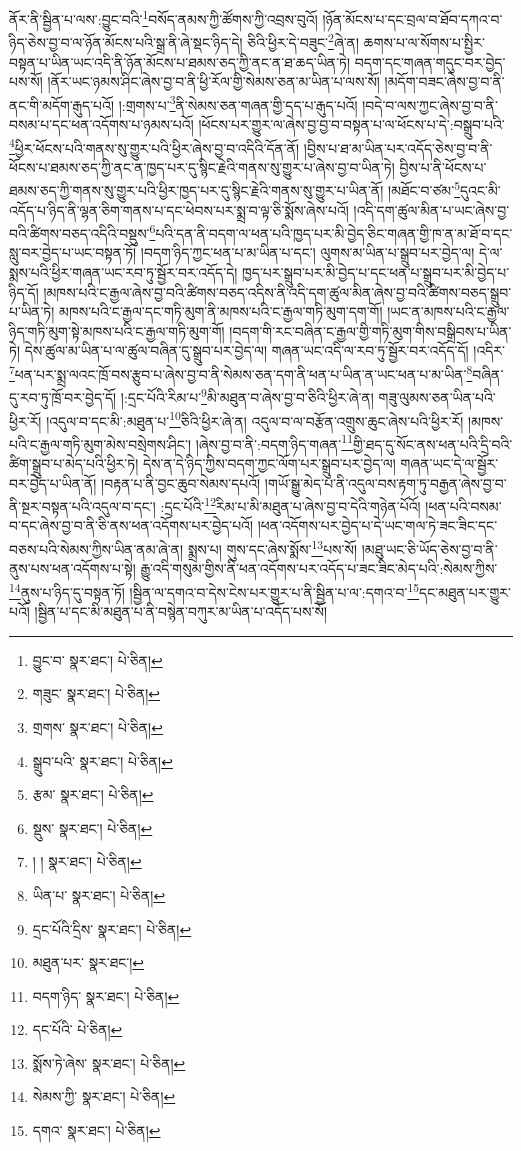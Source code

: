 ནོར་ནི་སྦྱིན་པ་ལས་:བྱུང་བའི་\footnote{བྱུང་བ་  སྣར་ཐང་།  པེ་ཅིན། }བསོད་ནམས་ཀྱི་ཚོགས་ཀྱི་འབྲས་བུའོ། །ཉོན་མོངས་པ་དང་བྲལ་བ་ཐོབ་དཀའ་བ་ཉིད་ཅེས་བྱ་བ་ལ་ཉོན་མོངས་པའི་སྒྲ་ནི་ཞེ་སྡང་ཉིད་དེ། ཅིའི་ཕྱིར་དེ་བཟུང་\footnote{གཟུང་  སྣར་ཐང་།  པེ་ཅིན། }ཞེ་ན། ཆགས་པ་ལ་སོགས་པ་སྤྱིར་བསྟན་པ་ཡིན་ཡང་འདི་ནི་ཉོན་མོངས་པ་ཐམས་ཅད་ཀྱི་ནང་ན་ཐ་ཆད་ཡིན་ཏེ། བདག་དང་གཞན་གདུང་བར་བྱེད་པས་སོ། །ནོར་ཡང་ཉམས་ཤིང་ཞེས་བྱ་བ་ནི་ཕྱི་རོལ་གྱི་སེམས་ཅན་མ་ཡིན་པ་ལས་སོ། །མདོག་བཟང་ཞེས་བྱ་བ་ནི་ནང་གི་མདོག་རྒུད་པའོ། །:གྲགས་པ་\footnote{གྲགས་  སྣར་ཐང་།  པེ་ཅིན། }ནི་སེམས་ཅན་གཞན་གྱི་དད་པ་རྒུད་པའོ། །བདེ་བ་ལས་ཀྱང་ཞེས་བྱ་བ་ནི་བསམ་པ་དང་ཕན་འདོགས་པ་ཉམས་པའོ། །ཕོངས་པར་གྱུར་ལ་ཞེས་བྱ་བྱ་བ་བསྟན་པ་ལ་ཕོངས་པ་དེ་:བསྒྲུབ་པའི་\footnote{སྒྲུབ་པའི་  སྣར་ཐང་།  པེ་ཅིན། }ཕྱིར་ཕོངས་པའི་གནས་སུ་གྱུར་པའི་ཕྱིར་ཞེས་བྱ་བ་འདིའི་དོན་ནོ། །བྱིས་པ་ཐ་མ་ཡིན་པར་འདོད་ཅེས་བྱ་བ་ནི་ཕོངས་པ་ཐམས་ཅད་ཀྱི་ནང་ན་ཁྱད་པར་དུ་སྙིང་རྗེའི་གནས་སུ་གྱུར་པ་ཞེས་བྱ་བ་ཡིན་ཏེ། བྱིས་པ་ནི་ཕོངས་པ་ཐམས་ཅད་ཀྱི་གནས་སུ་གྱུར་པའི་ཕྱིར་ཁྱད་པར་དུ་སྙིང་རྗེའི་གནས་སུ་གྱུར་པ་ཡིན་ནོ། །མཐོང་བ་ཙམ་\footnote{རྩམ་  སྣར་ཐང་།  པེ་ཅིན། }དུའང་མི་འདོད་པ་ཉིད་ནི་ལྷན་ཅིག་གནས་པ་དང་ཕེབས་པར་སྨྲ་བ་ལྟ་ཅི་སྨོས་ཞེས་པའོ། །འདི་དག་ཚུལ་མིན་པ་ཡང་ཞེས་བྱ་བའི་ཚིགས་བཅད་འདིའི་བསྡུས་\footnote{སྡུས་  སྣར་ཐང་།  པེ་ཅིན། }པའི་དན་ནི་བདག་ལ་ཕན་པའི་ཁྱད་པར་མི་བྱེད་ཅིང་གཞན་གྱི་ཁ་ན་མ་ཐོ་བ་དང་སླུ་བར་བྱེད་པ་ཡང་བསྟན་ཏོ། །བདག་ཉིད་ཀྱང་ཕན་པ་མ་ཡིན་པ་དང་། ལུགས་མ་ཡིན་པ་སྒྲུབ་པར་བྱེད་ལ། དེ་ལ་སྨས་པའི་ཕྱིར་གཞན་ཡང་རབ་ཏུ་སྦྱོར་བར་འདོད་དེ། ཁྱད་པར་སྒྲུབ་པར་མི་བྱེད་པ་དང་ཕན་པ་སྒྲུབ་པར་མི་བྱེད་པ་ཉིད་དོ། །མཁས་པའི་ང་རྒྱལ་ཞེས་བྱ་བའི་ཚིགས་བཅད་འདིས་ནི་འདི་དག་ཚུལ་མིན་ཞེས་བྱ་བའི་ཚིགས་བཅད་སྒྲུབ་པ་ཡིན་ཏེ། མཁས་པའི་ང་རྒྱལ་དང་གཏི་མུག་ནི་མཁས་པའི་ང་རྒྱལ་གཏི་མུག་དག་གོ། །ཡང་ན་མཁས་པའི་ང་རྒྱལ་ཉིད་གཏི་མུག་སྟེ་མཁས་པའི་ང་རྒྱལ་གཏི་མུག་གོ། །བདག་གི་རང་བཞིན་ང་རྒྱལ་གྱི་གཏི་མུག་གིས་བསྒྲིབས་པ་ཡིན་ཏེ། དེས་ཚུལ་མ་ཡིན་པ་ལ་ཚུལ་བཞིན་དུ་སྒྲུབ་པར་བྱེད་ལ། གཞན་ཡང་འདི་ལ་རབ་ཏུ་སྦྱོར་བར་འདོད་དོ། །འདིར་\footnote{། །  སྣར་ཐང་།  པེ་ཅིན། }ཕན་པར་སྨྲ་ལའང་ཁྲོ་བས་རྩུབ་པ་ཞེས་བྱ་བ་ནི་སེམས་ཅན་དག་ནི་ཕན་པ་ཡིན་ན་ཡང་ཕན་པ་མ་ཡིན་\footnote{ཡིན་པ་  སྣར་ཐང་།  པེ་ཅིན། }བཞིན་དུ་རབ་ཏུ་ཁྲོ་བར་བྱེད་དོ། །:དྲང་པོའི་རིམ་པ་\footnote{དྲང་པོའི་དྲིས་  སྣར་ཐང་།  པེ་ཅིན། }མི་མཐུན་བ་ཞེས་བྱ་བ་ཅིའི་ཕྱིར་ཞེ་ན། གཟུ་ལུམས་ཅན་ཡིན་པའི་ཕྱིར་རོ། །འདུལ་བ་དང་མི་:མཐུན་པ་\footnote{མཐུན་པར་  སྣར་ཐང་། }ཅིའི་ཕྱིར་ཞེ་ན། འདུལ་བ་ལ་བརྩོན་འགྲུས་ཆུང་ཞེས་པའི་ཕྱིར་རོ། །མཁས་པའི་ང་རྒྱལ་གཏི་མུག་མེས་བསྲེགས་ཤིང་། །ཞེས་བྱ་བ་ནི་:བདག་ཉིད་གཞན་\footnote{བདག་ཉིད་  སྣར་ཐང་།  པེ་ཅིན། }གྱི་ཐད་དུ་སོང་ནས་ཕན་པའི་དྲི་བའི་ཚིག་སྒྲུབ་པ་མེད་པའི་ཕྱིར་ཏེ། དེས་ན་དེ་ཉིད་ཀྱིས་བདག་ཀྱང་ལོག་པར་སྒྲུབ་པར་བྱེད་ལ། གཞན་ཡང་དེ་ལ་སྦྱོར་བར་བྱེད་པ་ཡིན་ནོ། །བརྟན་པ་ནི་བྱང་ཆུབ་སེམས་དཔའོ། །གཡོ་སྒྱུ་མེད་པ་ནི་འདུལ་བས་རྟག་ཏུ་བརྒྱན་ཞེས་བྱ་བ་ནི་སྔར་བསྟན་པའི་འདུལ་བ་དང་། :དྲང་པོའི་\footnote{དང་པོའི་  པེ་ཅིན། }རིམ་པ་མི་མཐུན་པ་ཞེས་བྱ་བ་དེའི་གཉེན་པོའོ། །ཕན་པའི་བསམ་བ་དང་ཞེས་བྱ་བ་ནི་ཅི་ནས་ཕན་འདོགས་པར་བྱེད་པའོ། །ཕན་འདོགས་པར་བྱེད་པ་དེ་ཡང་གལ་ཏེ་ཟང་ཟིང་དང་བཅས་པའི་སེམས་ཀྱིས་ཡིན་ནམ་ཞེ་ན། སྨྲས་པ། གུས་དང་ཞེས་སྨོས་\footnote{སྨོས་ཏེ་ཞེས་  སྣར་ཐང་།  པེ་ཅིན། }པས་སོ། །མཐུ་ཡང་ཅི་ཡོད་ཅེས་བྱ་བ་ནི་ནུས་པས་ཕན་འདོགས་པ་སྟེ། རྒྱུ་འདི་གསུམ་གྱིས་ནི་ཕན་འདོགས་པར་འདོད་པ་ཟང་ཟིང་མེད་པའི་:སེམས་ཀྱིས་\footnote{སེམས་ཀྱི་  སྣར་ཐང་།  པེ་ཅིན། }ནུས་པ་ཉིད་དུ་བསྟན་ཏོ། །སྦྱིན་ལ་དགའ་བ་དེས་ངེས་པར་གྱུར་པ་ནི་སྦྱིན་པ་ལ་:དགའ་བ་\footnote{དགའ་  སྣར་ཐང་།  པེ་ཅིན། }དང་མཐུན་པར་གྱུར་པའོ། །སྦྱིན་པ་དང་མི་མཐུན་པ་ནི་བསྙེན་བཀུར་མ་ཡིན་པ་འདོད་པས་སོ། 